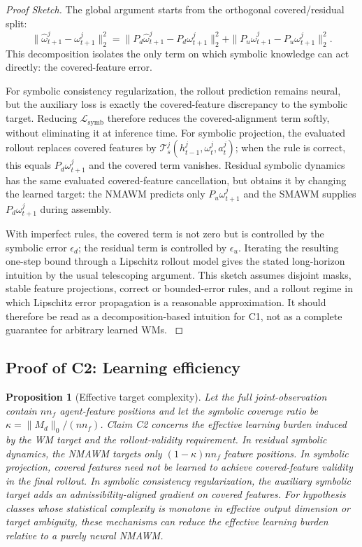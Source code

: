 \documentclass{article}
\theoremstyle{plain}
\newtheorem{proposition}[theorem]{Proposition}
\theoremstyle{definition}
\theoremstyle{remark}
\begin{document}
\begin{proof}[Proof Sketch]
  The global argument starts from the orthogonal covered/residual split:
  \[
    \|\hat{\omega}^{j}_{t+1}-\omega^{j}_{t+1}\|_2^2
    =
    \|P_d\hat{\omega}^{j}_{t+1}-P_d\omega^{j}_{t+1}\|_2^2
    +
    \|P_u\hat{\omega}^{j}_{t+1}-P_u\omega^{j}_{t+1}\|_2^2 .
  \]
  This decomposition isolates the only term on which symbolic knowledge can act directly: the covered-feature error.

  For symbolic consistency regularization, the rollout prediction remains neural, but the auxiliary loss is exactly the covered-feature discrepancy to the symbolic target. Reducing $\mathcal{L}_{\mathrm{symb}}$ therefore reduces the covered-alignment term softly, without eliminating it at inference time. For symbolic projection, the evaluated rollout replaces covered features by $\mathcal{T}^j_s(h^j_{t-1},\omega^j_t,a^j_t)$; when the rule is correct, this equals $P_d\omega^j_{t+1}$ and the covered term vanishes. Residual symbolic dynamics has the same evaluated covered-feature cancellation, but obtains it by changing the learned target: the NMAWM predicts only $P_u\omega^j_{t+1}$ and the SMAWM supplies $P_d\omega^j_{t+1}$ during assembly.

  With imperfect rules, the covered term is not zero but is controlled by the symbolic error $\epsilon_d$; the residual term is controlled by $\epsilon_u$. Iterating the resulting one-step bound through a Lipschitz rollout model gives the stated long-horizon intuition by the usual telescoping argument. This sketch assumes disjoint masks, stable feature projections, correct or bounded-error rules, and a rollout regime in which Lipschitz error propagation is a reasonable approximation. It should therefore be read as a decomposition-based intuition for C1, not as a complete guarantee for arbitrary learned WMs.
  \label{app:proofs:c1}
\end{proof}

\subsection{Proof of C2: Learning efficiency}
\label{app:proof-c2}

\begin{proposition}[Effective target complexity]
  Let the full joint-observation contain $n n_f$ agent-feature positions and let the symbolic coverage ratio be $\kappa=\|M_d\|_0/(n n_f)$. Claim C2 concerns the effective learning burden induced by the WM target and the rollout-validity requirement. In residual symbolic dynamics, the NMAWM targets only $(1-\kappa)n n_f$ feature positions. In symbolic projection, covered features need not be learned to achieve covered-feature validity in the final rollout. In symbolic consistency regularization, the auxiliary symbolic target adds an admissibility-aligned gradient on covered features. For hypothesis classes whose statistical complexity is monotone in effective output dimension or target ambiguity, these mechanisms can reduce the effective learning burden relative to a purely neural NMAWM.
\end{proposition}
\end{document}
